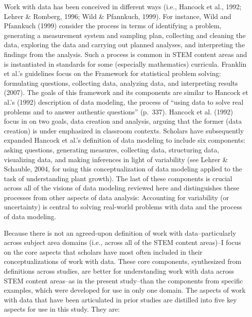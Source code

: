 \documentclass[]{book}
\theoremstyle{definition}
\theoremstyle{definition}
\theoremstyle{definition}
\theoremstyle{remark}
\begin{document}
Work with data has been conceived in different ways (i.e., Hancock et
al., 1992; Lehrer \& Romberg, 1996; Wild \& Pfannkuch, 1999). For
instance, Wild and Pfannkuch (1999) consider the process in terms of
identifying a problem, generating a measurement system and sampling
plan, collecting and cleaning the data, exploring the data and carrying
out planned analyses, and interpreting the findings from the analysis.
Such a process is common in STEM content areas and is instantiated in
standards for some (especially mathematics) curricula. Franklin et al.'s
guidelines focus on the Framework for statistical problem solving:
formulating questions, collecting data, analyzing data, and interpreting
results (2007). The goals of this framework and its components are
similar to Hancock et al.'s (1992) description of data modeling, the
process of ``using data to solve real problems and to answer authentic
questions'' (p.~337). Hancock et al. (1992) focus in on two goals, data
creation and analysis, arguing that the former (data creation) is under
emphasized in classroom contexts. Scholars have subsequently expanded
Hancock et al.'s definition of data modeling to include six components:
asking questions, generating measures, collecting data, structuring
data, visualizing data, and making inferences in light of variability
(see Lehrer \& Schauble, 2004, for using this conceptualization of data
modeling applied to the task of understanding plant growth). The last of
these components is crucial across all of the visions of data modeling
reviewed here and distinguishes these processes from other aspects of
data analysis: Accounting for variability (or uncertainty) is central to
solving real-world problems with data and the process of data modeling.

Because there is not an agreed-upon definition of work with
data--particularly across subject area domains (i.e., across all of the
STEM content areas)--I focus on the core aspects that scholars have most
often included in their conceptualizations of work with data. These core
components, synthesized from definitions across studies, are better for
understanding work with data across STEM content areas--as in the
present study--than the components from specific examples, which were
developed for use in only one domain. The aspects of work with data that
have been articulated in prior studies are distilled into five key
aspects for use in this study. They are:
\end{document}
